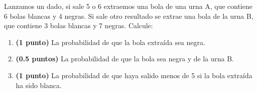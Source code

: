 
Lanzamos un dado, si sale 5 o 6 extraemos una bola de una urna A, que contiene 6 bolas blancas y 4 negras. Si sale otro resultado se extrae una bola de la urna B, que contiene 3 bolas blancas y 7 negras. Calcule:
\begin{enumerate}[label=\alph*)]
\item \textbf{(1 punto)} La probabilidad de que la bola extraída sea negra.
\item \textbf{(0.5 puntos)} La probabilidad de que la bola sea negra y de la urna B.
\item \textbf{(1 punto)} La probabilidad de que haya salido menos de 5 si la bola extraída ha sido blanca.
\end{enumerate}
